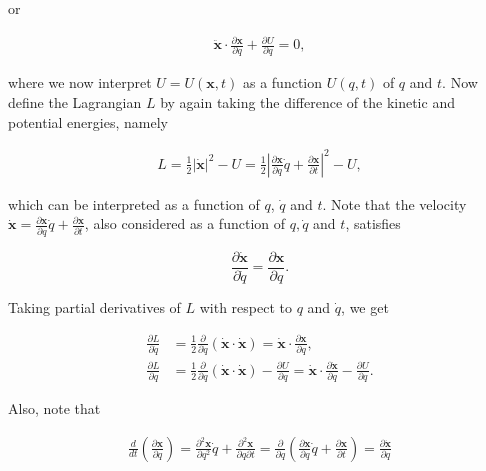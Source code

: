 \documentclass[11pt]{report}
\theoremstyle{plain}
\theoremstyle{definition}
\begin{document}
or

\begin{equation*} \tag{9}\label{eq:curveeq1}
\begin{split}
\ddot{\mathbf{x}} \cdot \frac{\partial \mathbf{x}}{\partial q} + \frac{\partial U}{\partial q} = 0,
\end{split}
\end{equation*}

where we now interpret $U=U(\mathbf{x},t)$ as a
function $U(q,t)$ of $q$ and $t$. Now define the
Lagrangian $L$ by again taking the difference of the
kinetic and potential energies, namely

\begin{align*}
L = \tfrac12 |\dot{\mathbf{x}}|^2 - U
= \tfrac12 \left| \frac{\partial \mathbf{x}}{\partial q} \dot{q} + \frac{\partial \mathbf{x}}{\partial t} \right|^2 - U,
\end{align*}

which can be interpreted as a function of $q$,
$\dot{q}$ and $t$. Note that the velocity
$\dot{\mathbf{x}}=\frac{\partial \mathbf{x}}{\partial
q} \dot{q} + \frac{\partial \mathbf{x}}{\partial t}$,
also considered as a function of $q, \dot{q}$ and $t$,
satisfies

\[
\frac{\partial \dot{\mathbf{x}}}{\partial \dot{q}} = \frac{\partial \mathbf{x}}{\partial q}.
\]

Taking partial derivatives of $L$ with respect to $q$
and $\dot{q}$, we get

\begin{equation*} \tag{10}\label{eq:curveeq2}
\begin{split}
\frac{\partial L}{\partial \dot{q}} &=
\tfrac12 \frac{\partial }{\partial \dot{q}} \left( \dot{\mathbf{x}}\cdot \dot{\mathbf{x}} \right)
=
\dot{\mathbf{x}} \cdot \frac{\partial \mathbf{x}}{\partial q}, \\
\frac{\partial L}{\partial q} &=
\tfrac12 \frac{\partial }{\partial q} \left( \dot{\mathbf{x}}\cdot \dot{\mathbf{x}} \right) - \frac{\partial U}{\partial q}
=
\dot{\mathbf{x}}\cdot \frac{\partial \dot{\mathbf{x}}}{\partial q}-\frac{\partial U}{\partial q}.
\end{split}
\end{equation*}

Also, note that

\begin{equation*} \tag{11}\label{eq:curveeq3}
\begin{split}
\frac{d}{dt}\left(\frac{\partial \mathbf{x}}{\partial q}\right) = \frac{\partial ^2 \mathbf{x}}{\partial q^2}\dot{q}
+ \frac{\partial ^2 \mathbf{x}}{\partial q\partial t} = \frac{\partial }{\partial q}
\left( \frac{\partial \mathbf{x}}{\partial q}\dot{q}+\frac{\partial \mathbf{x}}{\partial t}
\right) = \frac{\partial \mathbf{\dot{x}}}{\partial q}
\end{split}
\end{equation*}
\end{document}
